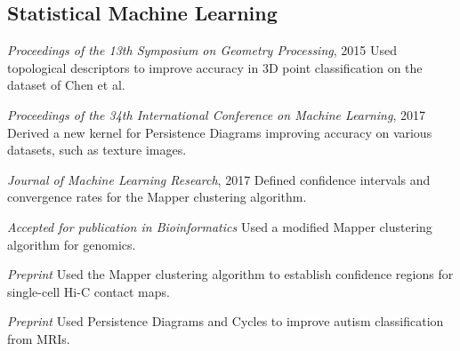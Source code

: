 \documentclass[11pt,a4paper]{moderncv}
\begin{document}
	\subsection{Statistical Machine Learning}

			  {\textit{Proceedings of the 13th Symposium on Geometry Processing}, 2015}
                          {}{}{\small Used topological descriptors to improve accuracy in 3D point classification on the dataset of Chen et al.}

                          {\textit{Proceedings of the 34th International Conference on Machine Learning}, 2017}
			  {}{}{\small Derived a new kernel for Persistence Diagrams improving accuracy on various datasets, such as texture images. }

                          {\textit{Journal of Machine Learning Research}, 2017}
                          {}{}{\small Defined confidence intervals and convergence rates for the Mapper clustering algorithm.}

                          {\textit{Accepted for publication in Bioinformatics}}
                          {}{}{\small Used a modified Mapper clustering algorithm for genomics.}

                          {\textit{Preprint}}
                          {}{}{\small Used the Mapper clustering algorithm to establish confidence regions for single-cell Hi-C contact maps.}

                          {\textit{Preprint}}
                          {}{}{\small Used Persistence Diagrams and Cycles to improve autism classification from MRIs.}
	
\end{document}
